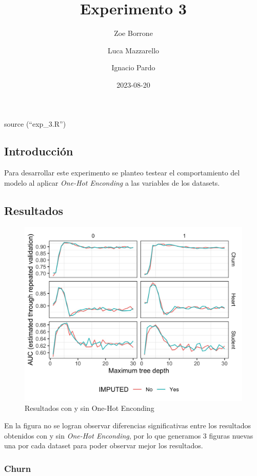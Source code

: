 \documentclass[
]{article}
\title{Experimento 3}
\author{Zoe Borrone \and Luca Mazzarello \and Ignacio Pardo}
\date{2023-08-20}
\begin{document}
\maketitle

source (``exp\_3.R'')

\hypertarget{introducciuxf3n}{%
\subsection{Introducción}\label{introducciuxf3n}}

Para desarrollar este experimento se planteo testear el comportamiento
del modelo al aplicar \emph{One-Hot Enconding} a las variables de los
datasets.

\hypertarget{resultados}{%
\subsection{Resultados}\label{resultados}}

\begin{figure}
\centering
\includegraphics{outputs/plots/exp3.jpg}
\caption{Resultados con y sin One-Hot Enconding}
\end{figure}

En la figura no se logran observar diferencias significativas entre los
resultados obtenidos con y sin \emph{One-Hot Enconding}, por lo que
generamos 3 figuras nuevas una por cada dataset para poder observar
mejor los resultados.

\hypertarget{churn}{%
\subsubsection{Churn}\label{churn}}
\end{document}
